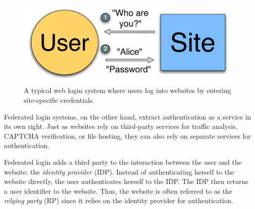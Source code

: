 \documentclass[11pt]{llncs}
\begin{document}
\begin{figure}
  \centering
  \includegraphics[scale=0.5]{figs/fig-passwd-color.pdf}
  \caption{A typical web login system where users log into websites by
    entering site-specific credentials. }
  \label{fig:passwd}
\end{figure}

Federated login systems, on the other hand, extract authentication as
a service in its own right. Just as websites rely on third-party services
for traffic analysis, CAPTCHA verification, or file hosting, they can
also rely on separate services for authentication.

Federated login adds a third party to the interaction between the user
and the website: the \emph{identity provider} (IDP). Instead of
authenticating herself to the website directly, the user authenticates
herself to the IDP. The IDP then returns a user identifier to the
website. Thus, the website is often referred to as the \emph{relying
  party} (RP) since it relies on the identity provider for
authentication.
\end{document}
